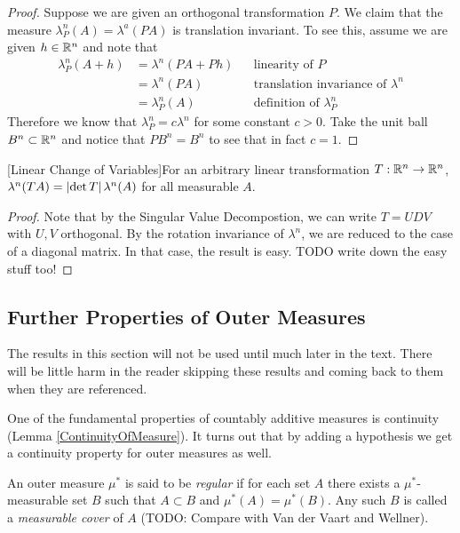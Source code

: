 \begin{proof}Suppose we are given an orthogonal transformation $P$.
  We claim that the measure $\lambda^n_P(A) = \lambda^a(P A)$ is
  translation invariant.   To see this, assume we are given $h \in
  \mathbb{R}^n$ and note that 
\begin{align*}
\lambda^n_P(A + h) &= \lambda^n(P A + Ph)  & &\text{linearity of $P$} \\
&= \lambda^n(PA) & &\text{translation invariance of $\lambda^n$} \\
&= \lambda^n_P(A) & &\text{definition of $\lambda^n_P$}
\end{align*}
Therefore we know that $\lambda^n_P = c \lambda^n$ for some constant
$c>0$.  Take the unit ball $B^n \subset \mathbb{R}^n$ and notice that $P
B^n = B^n$ to see that in fact $c = 1$.
\end{proof}
\begin{cor}\label{LesbegueLinearChangeOfVariables}[Linear Change of Variables]For an arbitrary linear transformation $T : \mathbb{R}^n \to
  \mathbb{R}^n$, $\lambda^n(T A) = \left \vert \det{T} \right \vert \lambda^n(A)$ for all
  measurable $A$.
\end{cor}
\begin{proof}Note that by the Singular Value Decompostion, we can
  write $T = U D V$ with $U,V$ orthogonal.  By the rotation invariance
  of $\lambda^n$, we are reduced to the case of a diagonal matrix.  In
  that case, the result is easy.
TODO write down the easy stuff too!
\end{proof}

\subsection{Further Properties of Outer Measures}

The results in this section will not be used until much later in the text.  There will be little harm in the reader skipping these results and coming back to them when they are referenced.

One of the fundamental properties of countably additive measures is continuity (Lemma \ref{ContinuityOfMeasure}).  It turns out that
by adding a hypothesis we get a continuity property for outer measures as well.

\begin{defn}An outer measure $\mu^*$ is said to be \emph{regular} if for each set $A$ there exists a $\mu^*$-measurable set $B$ such that
$A \subset B$ and $\mu^*(A) = \mu^*(B)$.  Any such $B$ is called a \emph{measurable cover} of $A$ (TODO: Compare with Van der Vaart and Wellner).
\end{defn}


